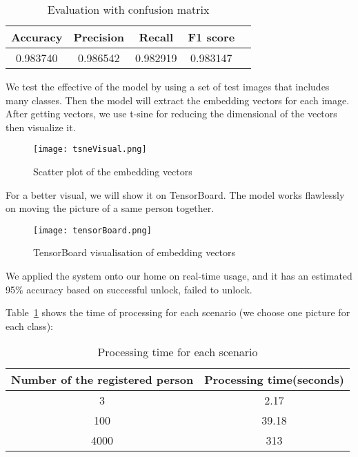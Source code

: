 \begin{table}[H]
    \centering
    \caption{Evaluation with confusion matrix}
    \begin{tabular}{|c|c|c|c|c|}
        \hline
        Accuracy & Precision & Recall & F1 score \\
        \hline
        0.983740 & 0.986542 & 0.982919 & 0.983147 \\
        \hline
    \end{tabular}
\end{table}

We test the effective of the model by using a set of test images that includes many classes. Then the model will extract the embedding vectors for each image. After getting vectors, we use t-sine for reducing the dimensional of the vectors then visualize it.

\begin{figure}[H]
    \centering
    \texttt{[image: tsneVisual.png]}
    \caption{Scatter plot of the embedding vectors}
\end{figure}

For a better visual, we will show it on TensorBoard. The model works flawlessly on moving the picture of a same person together.

\begin{figure}[H]
    \centering
    \texttt{[image: tensorBoard.png]}
    \caption{TensorBoard visualisation of embedding vectors}
\end{figure}

We applied the system onto our home on real-time usage, and it has an estimated 95\% accuracy based on successful unlock, failed to unlock.

Table~\ref{tab:trainingTime} shows the time of processing for each scenario (we choose one picture for each class):
\begin{table}[H]
    \centering
    \caption{Processing time for each scenario}
    \begin{tabular}{|c|c|}
        \hline
        Number of the registered person & Processing time(seconds) \\
        \hline
        3 & 2.17\\
        \hline
        100 & 39.18\\
        \hline
        4000 & 313\\
        \hline
    \end{tabular}
    \label{tab:trainingTime}
\end{table}

